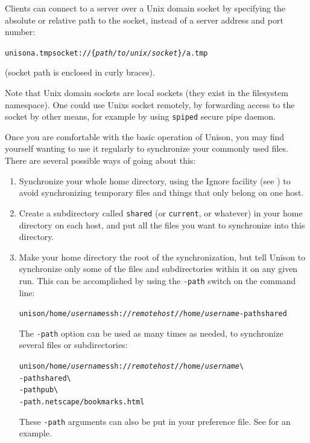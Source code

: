 \documentclass{article}
\newcommand{\NT}[1]{\textit{#1}}
\begin{document}
Clients can connect to a server over a Unix domain socket by specifying
the absolute or relative path to the socket, instead of a server address
and port number:
\begin{alltt}
       unison a.tmp socket://\textrm{\{}\NT{path/to/unix/socket}\textrm{\}}/a.tmp
\end{alltt}
(socket path is enclosed in curly braces).

Note that Unix domain sockets are local sockets (they exist in the
filesystem namespace).
One could use Unixs socket remotely, by forwarding access to the
socket by other means, for example by using {\tt spiped} secure pipe
daemon.


Once you are comfortable with the basic operation of Unison, you may
find yourself wanting to use it regularly to synchronize your commonly
used files.  There are several possible ways of going about this:

\begin{enumerate}
\item Synchronize your whole home directory, using the Ignore facility
(see )
to avoid synchronizing temporary files and things that only belong on
one host.
\item Create a subdirectory called {\tt shared} (or {\tt current}, or
whatever) in your home directory on each host, and put all the files
you want to synchronize into this directory.
\item Make your home directory the root of the synchronization, but
tell Unison to synchronize only some of the files and subdirectories
within it on any given run.  This can be accomplished by using the {\tt -path} switch
on the command line:
\begin{alltt}
       unison /home/\NT{username} ssh://\NT{remotehost}//home/\NT{username} -path shared
\end{alltt}
The {\tt -path} option can be used as many times as needed, to
synchronize several files or subdirectories:
\begin{alltt}
       unison /home/\NT{username} ssh://\NT{remotehost}//home/\NT{username} \verb|\|
          -path shared \verb|\|
          -path pub \verb|\|
          -path .netscape/bookmarks.html
\end{alltt}
These \verb|-path| arguments can also be put in your preference file.
See  for an example.
\end{enumerate}
\end{document}
